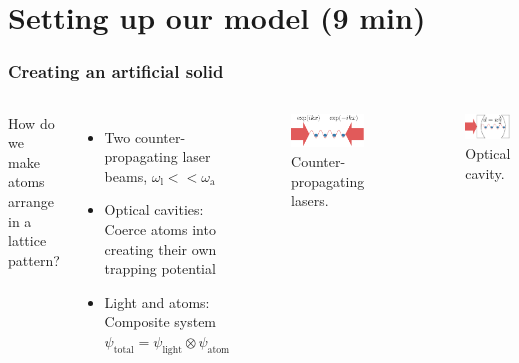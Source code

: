 \documentclass[pdflatex,compress]{beamer}
\begin{document}

\section{Setting up our model (9 min)}

\begin{frame}
\frametitle{Creating an artificial solid}
\begin{columns}
How do we make atoms arrange in a lattice pattern?
\begin{itemize}
	\item Two counter-propagating laser beams, $\omega_\text{l} << \omega_\text{a}$
	\item Optical cavities: Coerce atoms into creating their own trapping potential
	\item Light and atoms: Composite system $\psi_\text{total} = \psi_\text{light} \otimes \psi_\text{atom}$
\end{itemize}
\begin{figure}
\centering
\includegraphics[width=.6\textwidth]{images/counter_propagating.eps}
\vspace*{-5mm}
\caption{Counter-propagating lasers.}
\end{figure}
\vspace{-1.5em}
\begin{figure}
\centering
\includegraphics[width=.6\textwidth]{images/cavity.eps}
\vspace*{-5mm}
\caption{Optical cavity.}
\end{figure}
\end{columns}
\end{frame}
\end{document}
